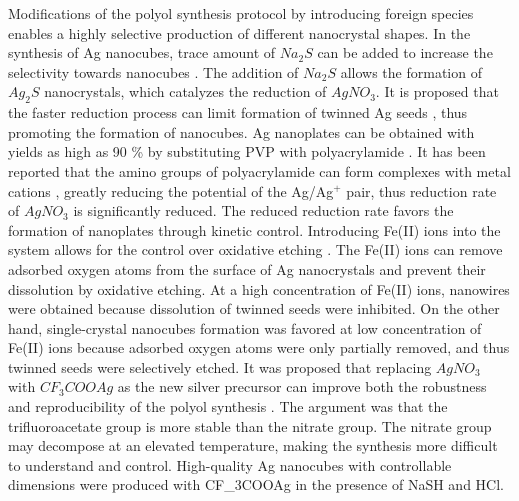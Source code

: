 Modifications of the polyol synthesis protocol by introducing foreign species enables a highly selective production of different nanocrystal shapes.
In the synthesis of Ag nanocubes, trace amount of $Na_2S$ can be added to increase the selectivity towards nanocubes \cite{Skrabalak_2007,Siekkinen_2006}.
The addition of $Na_2S$ allows the formation of $Ag_2S$ nanocrystals, which catalyzes the reduction of $AgNO_3$.
It is proposed that the faster reduction process can limit formation of twinned Ag seeds \cite{Wiley_2006}, thus promoting the formation of nanocubes.
Ag nanoplates can be obtained with yields as high as 90 \% by substituting PVP with polyacrylamide \cite{Xiong_2007}.
It has been reported that the amino groups of polyacrylamide can form complexes with metal cations \cite{Sari_2006}, greatly reducing the potential of the Ag/Ag$^+$ pair, thus reduction rate of $AgNO_3$ is significantly reduced.
The reduced reduction rate favors the formation of nanoplates through kinetic control.
Introducing Fe(II) ions into the system allows for the control over oxidative etching \cite{Wiley_2005}.
The Fe(II) ions can remove adsorbed oxygen atoms from the surface of Ag nanocrystals and prevent their dissolution by oxidative etching.
At a high concentration of Fe(II) ions, nanowires were obtained because dissolution of twinned seeds were inhibited.
On the other hand, single-crystal nanocubes formation was favored at low concentration of Fe(II) ions because adsorbed oxygen atoms were only partially removed, and thus twinned seeds were selectively etched.
It was proposed that replacing $AgNO_3$ with $CF_3COOAg$ as the new silver precursor can improve both the robustness and reproducibility of the polyol synthesis \cite{Zhang_2010}.
The argument was that the trifluoroacetate group is more stable than the nitrate group.
The nitrate group may decompose at an elevated temperature, making the synthesis more difficult to understand and control.
High-quality Ag nanocubes with controllable dimensions were produced with CF_3COOAg in the presence of NaSH and HCl.

